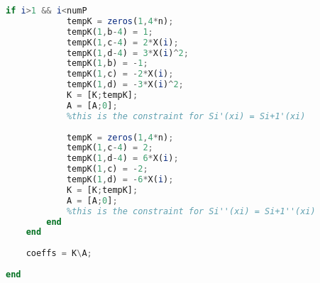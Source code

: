 \documentclass[11pt]{article} %
\begin{document}
\begin{lstlisting}[language=Octave]
        if i>1 && i<numP
            tempK = zeros(1,4*n);
            tempK(1,b-4) = 1;
            tempK(1,c-4) = 2*X(i);
            tempK(1,d-4) = 3*X(i)^2;
            tempK(1,b) = -1;
            tempK(1,c) = -2*X(i);
            tempK(1,d) = -3*X(i)^2;
            K = [K;tempK];
            A = [A;0];
            %this is the constraint for Si'(xi) = Si+1'(xi)
            
            tempK = zeros(1,4*n);
            tempK(1,c-4) = 2;
            tempK(1,d-4) = 6*X(i);
            tempK(1,c) = -2;
            tempK(1,d) = -6*X(i);
            K = [K;tempK];
            A = [A;0];
            %this is the constraint for Si''(xi) = Si+1''(xi)
        end
    end
    
    coeffs = K\A;
    
end
\end{lstlisting}
\end{document}
